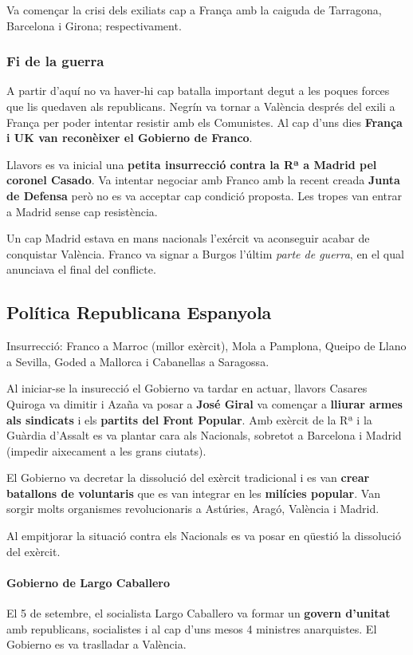 \documentclass[arial,a4paper,print]{article}
\begin{document}
Va començar la crisi dels exiliats cap a França amb la caiguda de Tarragona, Barcelona i Girona; respectivament. 

\subsubsection{Fi de la guerra}
A partir d'aquí no va haver-hi cap batalla important degut a les poques forces que lis quedaven als republicans. Negrín va tornar a València després del exili a França per poder intentar resistir amb els Comunistes. Al cap d'uns dies \textbf{França i UK van reconèixer el Gobierno de Franco}. 

Llavors es va inicial una \textbf{petita insurrecció contra la Rª a Madrid pel coronel Casado}. Va intentar negociar amb Franco amb la recent creada \textbf{Junta de Defensa} però no es va acceptar cap condició proposta. Les tropes van entrar a Madrid sense cap resistència. 

Un cap Madrid estava en mans nacionals l'exércit va aconseguir acabar de conquistar València. Franco va signar a Burgos l'últim \textit{parte de guerra}, en el qual anunciava el final del conflicte. 

\subsection{Política Republicana Espanyola}
Insurrecció: Franco a Marroc (millor exèrcit), Mola a Pamplona, Queipo de Llano a Sevilla, Goded a Mallorca i Cabanellas a Saragossa. 

Al iniciar-se la insurecció el Gobierno va tardar en actuar, llavors Casares Quiroga va dimitir i Azaña va posar a \textbf{José Giral} va començar a \textbf{lliurar armes als sindicats} i els \textbf{partits del Front Popular}. Amb exèrcit de la Rª i la Guàrdia d'Assalt es va plantar cara als Nacionals, sobretot a Barcelona i Madrid (impedir aixecament a les grans ciutats). 

El Gobierno va decretar la dissolució del exèrcit tradicional i es van \textbf{crear batallons de voluntaris} que es van integrar en les  \textbf{milícies popular}. Van sorgir molts organismes revolucionaris a Astúries, Aragó, València i Madrid. 

Al empitjorar la situació contra els Nacionals es va posar en qüestió la dissolució del exèrcit. 

\paragraph{Gobierno de Largo Caballero}
El 5 de setembre, el socialista Largo Caballero va formar un \textbf{govern d'unitat} amb republicans, socialistes i al cap d'uns mesos 4 ministres anarquistes. El Gobierno es va traslladar a València. 
\end{document}
